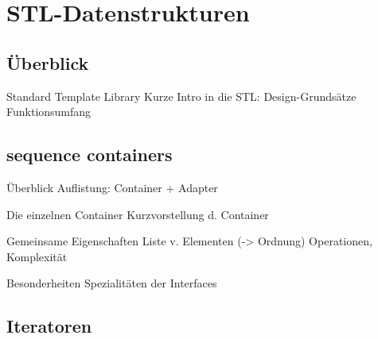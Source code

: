 \section{STL-Datenstrukturen}

\subsection{Überblick}

\begin{frame}{Standard Template Library}
	Kurze Intro in die STL:
	Design-Grundsätze
	Funktionsumfang
	
	
\end{frame}


\subsection{sequence containers}

\begin{frame}[fragile]{Überblick}
	Auflistung: Container + Adapter
\end{frame}

\begin{frame}[fragile]{Die einzelnen Container}
	Kurzvorstellung d. Container
\end{frame}

\begin{frame}{Gemeinsame Eigenschaften}
	Liste v. Elementen (-> Ordnung)
	Operationen, Komplexität
\end{frame}

\begin{frame}{Besonderheiten}
	Spezialitäten der Interfaces
\end{frame}

\subsection{Iteratoren}


